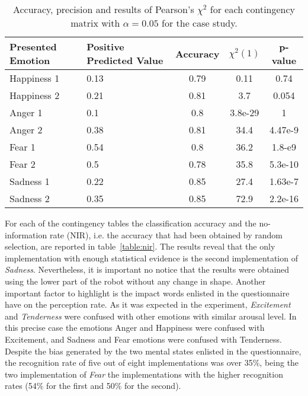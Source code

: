 \clearpage
\begin{table}[h]
\centering
\small
\caption{Accuracy, precision and results of Pearson's $\chi^2$ for each contingency matrix with $\alpha = 0.05$ for the case study.} 
\label{table:Precision2}
		\begin{tabular}{|p{1.5 cm}|p{1.5 cm}|c|c|c|}
		\hline
		\textbf{Presented Emotion} & \textbf{Positive Predicted Value} & \textbf{Accuracy} & \textbf{$\chi^2(1)$} & \textbf{p-value}\\
		\hline
		Happiness 1 & 0.13 & 0.79 & 0.11 & 0.74\\
		\hline
		Happiness 2 & 0.21 & 0.81& 3.7 &0.054\\
		\hline
		Anger 1 & 0.1 & 0.8 & 3.8e-29 & 1\\
		\hline
		Anger 2 & 0.38 & 0.81 & 34.4 & 4.47e-9\\
		\hline
		Fear 1 & 0.54 & 0.8 & 36.2 & 1.8-e9\\
		\hline 
		Fear 2 & 0.5 & 0.78 & 35.8 & 5.3e-10\\
		\hline
		Sadness 1 & 0.22 & 0.85 & 27.4 & 1.63e-7\\
		\hline
		Sadness 2 & 0.35 & 0.85 & 72.9 & 2.2e-16\\		 
		\hline
			\end{tabular}
\end{table}  

 For each of the contingency tables the classification accuracy and the no-information rate (NIR), i.e. the accuracy that had been obtained by random selection, are reported in table~\ref{table:nir}. The results reveal that the only implementation with enough statistical evidence is the second implementation of \textit{Sadness}. 
Nevertheless, it is important no notice that the results were obtained using the lower part of the robot without any change in shape. Another important factor to highlight is the impact words enlisted in the questionnaire have on the perception rate. As it was expected in the experiment, \textit{Excitement} and \textit{Tenderness} were confused with other emotions with similar arousal level. In this precise case the emotions Anger and Happiness were confused with Excitement, and Sadness and Fear emotions were confused with Tenderness. Despite the bias generated by the two mental states enlisted in the questionnaire, the recognition rate of five out of eight implementations was over 35\%, being the two implementation of \textit{Fear} the implementations with the higher recognition rates (54\% for the first and 50\% for the second).


